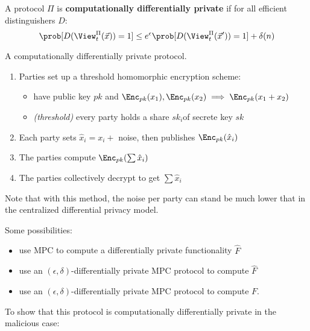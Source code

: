 \begin{defn}
A protocol $\Pi$ is \textbf{computationally differentially private} if for all efficient distinguishers $D$:
\[
    \prob[D(\View_t^\Pi(\vec{x})) = 1] \leq 
    e^\epsilon \prob[D(\View_t^\Pi(\vec{x}')) = 1] + \delta(n)
\]
\end{defn}

\begin{expl}
A computationally differentially private protocol.
\begin{enumerate}
\item 
Parties set up a threshold homomorphic encryption scheme:
\begin{itemize}
\item have public key $pk$ and $\Enc_{pk}(x_1), \Enc_{pk}(x_2) \implies \Enc_{pk}(x_1 + x_2)$
\item \textit{(threshold)} every party holds a share $sk_i$of secrete key $sk$
\end{itemize}
\item 
Each party sets $\hat{x}_i = x_i +$ noise,
then publishes $\Enc_{pk}(\hat{x}_i)$
\item 
The parties compute $\Enc_{pk}(\sum \hat{x}_i)$
\item 
The parties collectively decrypt to get $\sum \hat{x}_i$
\end{enumerate}
Note that with this method, the noise per party can stand be much lower that in the centralized differential privacy model.
\end{expl}

Some possibilities:
\begin{itemize}
\item use MPC to compute a differentially private functionality $\hat{F}$
\item use an $(\epsilon, \delta)$-differentially private MPC protocol to compute $\hat{F}$
\item use an $(\epsilon, \delta)$-differentially private MPC protocol to compute $F$.
\end{itemize}


To show that this protocol is computationally differentially private in the malicious case:



